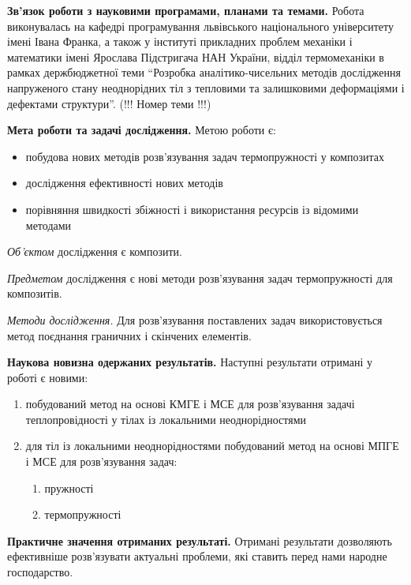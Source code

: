 \textbf{Зв'язок роботи з науковими програмами, планами та темами.} Робота виконувалась на кафедрі програмування
львівського національного університету імені Івана Франка, а також у інституті прикладних проблем механіки і математики
імені Ярослава Підстригача НАН України, відділ термомеханіки в рамках держбюджетної теми ``Розробка аналітико-чисельних
методів дослідження напруженого стану неоднорідних тіл з тепловими та залишковими деформаціями і дефектами структури''.
(!!! Номер теми !!!)

\textbf{Мета роботи та задачі дослідження.} Метою роботи є:

\begin{itemize}
\item
  побудова нових методів розв'язування задач термопружності у композитах
\item
  дослідження ефективності нових методів
\item
  порівняння швидкості збіжності і використання ресурсів із відомими методами
\end{itemize}

\emph{Об'єктом} дослідження є композити.

\emph{Предметом} дослідження є нові методи розв'язування задач термопружності для композитів.

\emph{Методи дослідження.} Для розв'язування поставлених задач використовується метод поєднання граничних і скінчених
елементів.

\textbf{Наукова новизна одержаних результатів.} Наступні результати отримані у роботі є новими:

\begin{enumerate}
\def\labelenumi{\arabic{enumi}.}
\item
  побудований метод на основі КМГЕ і МСЕ для розв'язування задачі теплопровідності у тілах із локальними
  неоднорідностями
\item
  для тіл із локальними неоднорідностями побудований метод на основі МПГЕ і МСЕ для розв'язування задач:

  \begin{enumerate}
  \def\labelenumii{\alph{enumii}.}
  \item
    пружності
  \item
    термопружності
  \end{enumerate}
\end{enumerate}

\textbf{Практичне значення отриманих результаті.} Отримані результати дозволяють ефективніше розв'язувати актуальні
проблеми, які ставить перед нами народне господарство.

